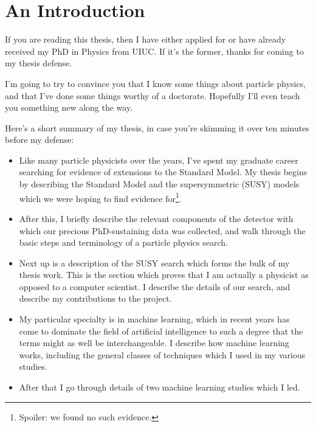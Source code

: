 \chapter*{An Introduction}

If you are reading this thesis, then I have either applied for or have  already received my PhD in Physics from UIUC. If it's the former, thanks for coming to my thesis defense.

I'm going to try to convince you that I know some things about particle physics, and that I've done some things worthy of a doctorate. Hopefully I'll even teach you something new along the way.

Here's a short summary of my thesis, in case you're skimming it over ten minutes before my defense:

\begin{itemize}

    \item Like many particle physicists over the years, I've spent my graduate career searching for evidence of extensions to the Standard Model. My thesis begins by describing the Standard Model and the supersymmetric (SUSY) models which we were hoping to find evidence for\footnote{Spoiler: we found no such evidence.}.
    
    \item After this, I briefly describe the relevant components of the detector with which our precious PhD-sustaining data was collected, and walk through the basic steps and terminology of a particle physics search.
    
    \item Next up is a description of the SUSY search which forms the bulk of my thesis work. This is the section which proves that I am actually a physicist as opposed to a computer scientist. I describe the details of our search, and describe my contributions to the project.

    \item My particular specialty is in machine learning, which in recent years has come to dominate the field of artificial intelligence to such a degree that the terms might as well be interchangeable. I describe how machine learning works, including the general classes of techniques which I used in my various studies.
    
    \item After that I go through details of two machine learning studies which I led.
    
    \begin{itemize}
    

\end{itemize}
\end{itemize}
